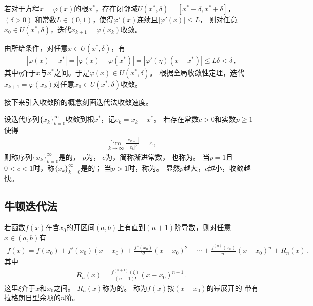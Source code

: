 \begin{theorem}[局部收敛性定理]
    若对于方程$x=\varphi(x)$的根$x^*$，存在闭邻域$U(x^*,\delta)=[x^*-\delta,x^*+\delta]$，$(\delta>0)$
    和常数$L\in(0,1)$，使得$\varphi'(x)$连续且$|\varphi'(x)|\le L$，
    则对任意$x_0\in U(x^*,\delta)$，迭代$x_{k+1}=\varphi(x_k)$收敛。
\end{theorem}
\begin{prove}
    由所给条件，对任意$x\in U(x^*,\delta)$，有
    \begin{align}\label{eq:02ex0323}
        |\varphi(x)-x^*|=|\varphi(x)-\varphi(x^*)|=|\varphi'(\eta)(x-x^*)|\le L\delta<\delta\, ,
    \end{align}
    其中$\eta$介于$x$与$x^*$之间。于是$\varphi(x)\in U(x^*,\delta)$。
    根据全局收敛性定理，迭代$x_{k+1}=\varphi(x_k)$对任意$x_0\in U(x^*,\delta)$收敛。
\end{prove}

接下来引入收敛阶的概念刻画迭代法收敛速度。
\begin{definition}
    设迭代序列$\{x_k\}_{k=0}^\infty$收敛到根$x^*$，记$e_k=x_k-x^*$。
    若存在常数$c>0$和实数$p\ge1$使得
    \begin{align}\label{eq:02ex0324}
        \lim\limits_{k\rightarrow\infty}{\frac{|e_{k+1}|}{|e_k|^p}}=c\, ,
    \end{align}
    则称序列$\{x_k\}_{k=0}^\infty$是的，
    $p$为，
    $c$为，简称渐进常数，
    也称为。
    当$p=1$且$0<c<1$时，称$\{x_k\}_{k=0}^\infty$是的；
    当$p>1$时，称为。
    显然$p$越大，$c$越小，收敛越快。
\end{definition}

\subsection{牛顿迭代法}\label{sub:牛顿迭代法}
\begin{theorem}
    若函数$f(x)$在含$x_0$的开区间$(a,b)$上有直到$(n+1)$阶导数，则对任意$x\in(a,b)$有
    \begin{align}\label{eq:02ex0325.1}
        f(x)=f(x_0)+f'(x_0)(x-x_0)+\frac{f''(x_0)}{2!}(x-x_0)^2+\cdots+\frac{f^{(n)}(x_0)}{n!}(x-x_0)^n+R_n(x)\, ,
    \end{align}
    其中
    \begin{align}\label{eq:02ex0325.2}
        R_n(x)=\frac{f^{(n+1)}(\xi)}{(n+1)!}(x-x_0)^{n+1}\, .
    \end{align}
    这里$\xi$介于$x$和$x_0$之间。
    $R_n(x)$称为的。
    称为$f(x)$按$(x-x_0)$的幂展开的
    带有拉格朗日型余项的$n$阶。
\end{theorem}

